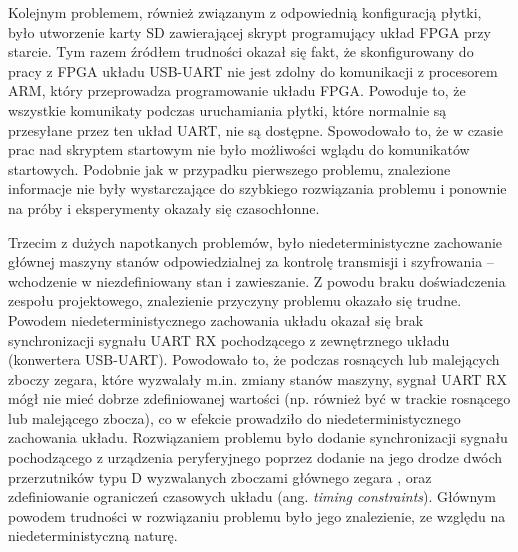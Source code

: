 Kolejnym problemem, również związanym z odpowiednią konfiguracją płytki, było utworzenie karty SD zawierającej skrypt programujący układ FPGA przy starcie. Tym razem źródłem trudności okazał się fakt, że skonfigurowany do pracy z FPGA układu USB-UART nie jest zdolny do komunikacji z procesorem ARM, który przeprowadza programowanie układu FPGA. Powoduje to, że wszystkie komunikaty podczas uruchamiania płytki, które normalnie są przesyłane przez ten układ UART, nie są dostępne. Spowodowało to, że w czasie prac nad skryptem startowym nie było możliwości wglądu do komunikatów startowych. Podobnie jak w przypadku pierwszego problemu, znalezione informacje nie były wystarczające do szybkiego rozwiązania problemu i ponownie na próby i eksperymenty okazały się czasochłonne.

Trzecim z dużych napotkanych problemów, było niedeterministyczne zachowanie głównej maszyny stanów odpowiedzialnej za kontrolę transmisji i szyfrowania -- wchodzenie w niezdefiniowany stan i zawieszanie. Z powodu braku doświadczenia zespołu projektowego, znalezienie przyczyny problemu okazało się trudne. Powodem niedeterministycznego zachowania układu okazał się brak synchronizacji sygnału UART RX pochodzącego z zewnętrznego układu (konwertera USB-UART). Powodowało to, że podczas rosnących lub malejących zboczy zegara, które wyzwalały m.in. zmiany stanów maszyny, sygnał UART RX mógł nie mieć dobrze zdefiniowanej wartości (np. również być w trackie rosnącego lub malejącego zbocza), co w efekcie prowadziło do niedeterministycznego zachowania układu. Rozwiązaniem problemu było dodanie synchronizacji sygnału pochodzącego z urządzenia peryferyjnego poprzez dodanie na jego drodze dwóch przerzutników typu D wyzwalanych zboczami głównego zegara \cite{altera-metastability, 2ff-synchronization}, oraz zdefiniowanie ograniczeń czasowych układu (ang. \textit{timing constraints}). Głównym powodem trudności w rozwiązaniu problemu było jego znalezienie, ze względu na niedeterministyczną naturę.

\newpage